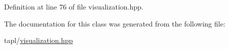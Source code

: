 Definition at line 76 of file visualization.\+hpp.



The documentation for this class was generated from the following file\+:\begin{DoxyCompactItemize}
\item 
tapl/\hyperlink{visualization_8hpp}{visualization.\+hpp}\end{DoxyCompactItemize}
